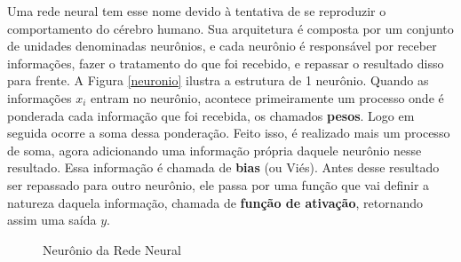 Uma rede neural tem esse nome devido à tentativa de se reproduzir o comportamento do cérebro humano. Sua arquitetura é composta por um conjunto de unidades denominadas neurônios, e cada neurônio é responsável por receber informações, fazer o tratamento do que foi recebido, e repassar o resultado disso para frente. A Figura \ref{neuronio} ilustra a estrutura de 1 neurônio. Quando as informações $x_i$ entram no neurônio, acontece primeiramente um processo onde é ponderada cada informação que foi recebida, os chamados \textbf{pesos}. Logo em seguida ocorre a soma dessa ponderação. Feito isso, é realizado mais um processo de soma, agora adicionando uma informação própria daquele neurônio nesse resultado. Essa informação é chamada de \textbf{bias} (ou Viés). Antes desse resultado ser repassado para outro neurônio, ele passa por uma função que vai definir a natureza daquela informação, chamada de \textbf{função de ativação}, retornando assim uma saída $y$.

 \begin{figure}[H]
    \centering
     \caption{Neurônio da Rede Neural}
   
    \label{fig:my_label}
\end{figure} 


